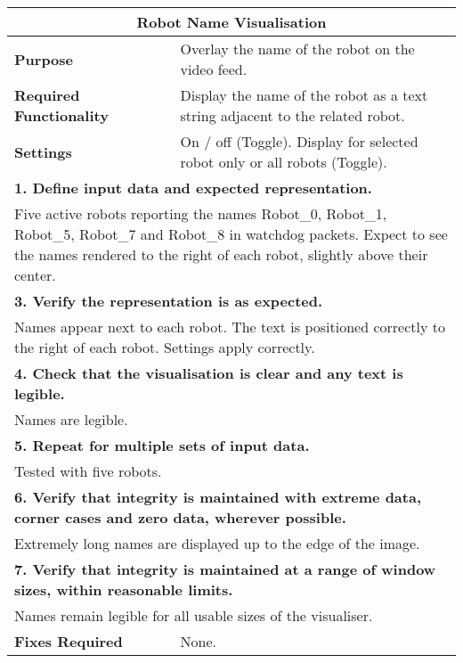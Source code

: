 \begin{longtable}{ l p{10cm} }
 \hline
 \multicolumn{2}{c}{\textbf{Robot Name Visualisation}}\\
 \hline
 \textbf{Purpose} & Overlay the name of the robot on the video feed.\\
 \textbf{Required Functionality} & Display the name of the robot as a text string adjacent to the related robot.\\
 \textbf{Settings} & On / off (Toggle). Display for selected robot only or all robots (Toggle).\\
 \hline
 \multicolumn{2}{p{14cm}}{\textbf{1. Define input data and expected representation.}}\\
 \multicolumn{2}{p{14cm}}{Five active robots reporting the names Robot\_0, Robot\_1, Robot\_5, Robot\_7 and Robot\_8 in watchdog packets. Expect to see the names rendered to the right of each robot, slightly above their center.}\\
 \hline
 \multicolumn{2}{p{14cm}}{\textbf{3. Verify the representation is as expected.}}\\
 \multicolumn{2}{p{14cm}}{Names appear next to each robot. The text is positioned correctly to the right of each robot. Settings apply correctly.}\\
 \hline
 \multicolumn{2}{p{14cm}}{\textbf{4. Check that the visualisation is clear and any text is legible.}}\\
 \multicolumn{2}{p{14cm}}{Names are legible.}\\
 \hline
 \multicolumn{2}{p{14cm}}{\textbf{5. Repeat for multiple sets of input data.}}\\
 \multicolumn{2}{p{14cm}}{Tested with five robots.}\\
 \hline
 \multicolumn{2}{p{14cm}}{\textbf{6. Verify that integrity is maintained with extreme data, corner cases and zero data, wherever possible.}}\\
 \multicolumn{2}{p{14cm}}{Extremely long names are displayed up to the edge of the image.}\\
 \hline
 \multicolumn{2}{p{14cm}}{\textbf{7. Verify that integrity is maintained at a range of window sizes, within reasonable limits.}}\\
 \multicolumn{2}{p{14cm}}{Names remain legible for all usable sizes of the visualiser.}\\
 \hline
 \textbf{Fixes Required} & None.\\
 \bottomrule
\end{longtable}
\clearpage

